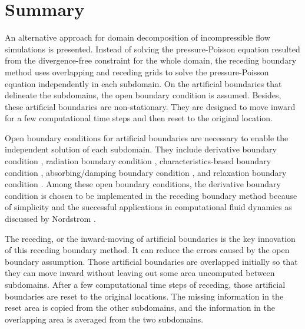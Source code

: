 \normalsize
\section{Summary}

An alternative approach for domain decomposition of incompressible flow simulations is presented. Instead of solving the pressure-Poisson equation resulted from the divergence-free constraint for the whole domain, the receding boundary method uses overlapping and receding grids to solve the pressure-Poisson equation independently in each subdomain. On the artificial boundaries that delineate the subdomains, the open boundary condition is assumed. Besides, these artificial boundaries are non-stationary. They are designed to move inward for a few computational time steps and then reset to the original location.

Open boundary conditions for artificial boundaries are necessary to enable the independent solution of each subdomain. They include derivative boundary condition \cite{Nordstrom1995}, radiation boundary condition \cite{Sommerfeld1949, Orlanski1976, Engquist1977, Higdon86}, characteristics-based boundary condition \cite{Henderson1966}, absorbing/damping boundary condition \cite{Kosloff1986, Petropoulos1998, Shin1995}, and relaxation boundary condition \cite{Davies1983, Martinsen1987}. Among these open boundary conditions, the derivative boundary condition is chosen to be implemented in the receding boundary method because of simplicity and the successful applications in computational fluid dynamics as discussed by Nordstrom \cite{Nordstrom1995}.

The receding, or the inward-moving of artificial boundaries is the key innovation of this receding boundary method. It can reduce the errors caused by the open boundary assumption. Those artificial boundaries are overlapped initially so that they can move inward without leaving out some area uncomputed between subdomains. After a few computational time steps of receding, those artificial boundaries are reset to the original locations. The missing information in the reset area is copied from the other subdomains, and the information in the overlapping area is averaged from the two subdomains.

